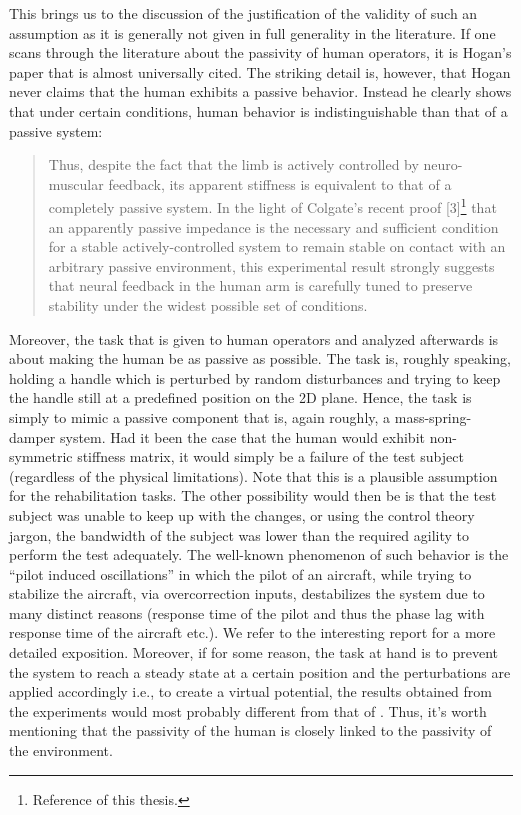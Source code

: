 This brings us to the discussion of the justification of the validity of such an assumption as it is generally not given in full generality in the
literature. If one scans through the literature about the passivity of human operators, it is Hogan's paper \cite{hogan89}
that is almost universally cited. The striking detail is, however, that Hogan never claims that the human exhibits a passive
behavior. Instead he clearly shows that under certain conditions, human behavior is indistinguishable than that of a 
passive system: 
\begin{quote}
Thus, despite the fact that the
limb is actively controlled by neuro-muscular feedback, its apparent
stiffness is equivalent to that of a completely passive
system. In the light of Colgate's recent proof [3]\footnote{Reference 
\cite{colgatehogan88} of this thesis.} that an
apparently passive impedance is the necessary and sufficient
condition for a stable actively-controlled system to remain stable
on contact with an arbitrary passive environment, this
experimental result strongly suggests that neural feedback in the
human arm is carefully tuned to preserve stability under the
widest possible set of conditions.
\end{quote}
Moreover, the task that is given to human operators and analyzed afterwards is about making the human 
be as passive as possible. The task is, roughly speaking, holding a handle which is perturbed by random disturbances and 
trying to keep the handle still at a predefined position on the 2D plane. Hence, the task is simply to mimic a passive 
component that is, again roughly, a mass-spring-damper system. Had it been the case that the human would exhibit non-symmetric 
stiffness matrix, it would simply be a failure of the test subject (regardless of the physical limitations). Note that this 
is a plausible assumption for the rehabilitation tasks. The other possibility would then be is that the test subject was unable to keep up 
with the changes, or using the control theory jargon, the bandwidth of the subject was lower than the required agility to 
perform the test adequately.  The well-known phenomenon of such behavior is the ``pilot induced oscillations'' in which the pilot
of an aircraft, while trying to stabilize the aircraft, via overcorrection inputs, destabilizes the system due to many distinct reasons 
(response time of the pilot and thus the phase lag with response time of the aircraft etc.). We refer to the interesting 
report \cite{mcruer} for a more detailed exposition. Moreover, if for some reason, the task at hand is to prevent the system 
to reach a steady state at a certain position and the perturbations are applied accordingly i.e., to create a virtual potential, 
the results obtained from the experiments would most probably different from that of \cite{mussa85}. Thus, it's worth mentioning 
that the passivity of the human is closely linked to the passivity of the environment. 


